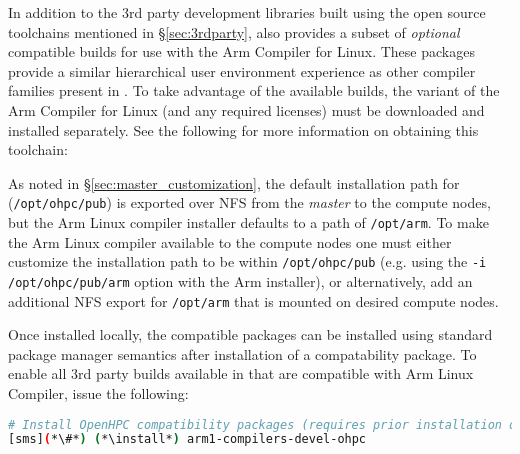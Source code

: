 In addition to the 3rd party development libraries built using the open source
toolchains mentioned in \S\ref{sec:3rdparty}, \OHPC{} also provides a subset of
{\em optional} compatible builds for use with the Arm Compiler for Linux.
These packages provide a similar hierarchical user environment experience as
other compiler families present in \OHPC{}.  To take advantage of the
available builds, the \OHPC{} variant of the Arm Compiler for Linux (and any
required licenses) must be downloaded and installed separately. See the
following for more information on obtaining this toolchain:

\begin{center}
  \href{https://developer.arm.com/tools-and-software/server-and-hpc/downloads/arm-allinea-studio/openhpc}
       {\color{blue}{https://developer.arm.com/tools-and-software/server-and-hpc/downloads/arm-allinea-studio/openhpc}}
\end{center}



\begin{center}
\begin{tcolorbox}[]
As noted in \S\ref{sec:master_customization}, the default installation path for
\OHPC{} (\texttt{/opt/ohpc/pub}) is exported over NFS from the {\em master} to the 
compute nodes, but the Arm Linux compiler installer defaults to a path of 
\texttt{/opt/arm}. To make the Arm Linux compiler available to the compute 
nodes one must either customize the installation path to be 
within \texttt{/opt/ohpc/pub} (e.g. using the \texttt{-i /opt/ohpc/pub/arm}
option with the Arm installer), or alternatively, add an additional NFS export
for \texttt{/opt/arm} that is mounted on desired compute nodes.
\end{tcolorbox}
\end{center}

Once installed locally, the \OHPC{}
compatible packages can be installed using standard package manager semantics
after installation of a compatability package.
\noindent To enable all 3rd party builds available in \OHPC{} that are compatible with
Arm Linux Compiler, issue the following:

\begin{lstlisting}[language=bash,keywords={},upquote=true,keepspaces]
# Install OpenHPC compatibility packages (requires prior installation of Arm Linux Compiler)
[sms](*\#*) (*\install*) arm1-compilers-devel-ohpc
\end{lstlisting}


